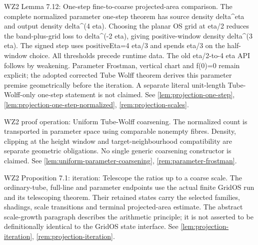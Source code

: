 \begin{remark}
\label{rem:atlas-W2L7_12}
WZ2 Lemma 7.12: One-step fine-to-coarse projected-area comparison.
The complete normalized parameter one-step theorem has source density delta\textasciicircum{}eta and output density delta\textasciicircum{}(4 eta). Choosing the planar OS grid at eta/2 reduces the band-plus-grid loss to delta\textasciicircum{}(-2 eta), giving positive-window density delta\textasciicircum{}(3 eta). The signed step uses positiveEta=4 eta/3 and spends eta/3 on the half-window choice. All thresholds precede runtime data. The old eta/2-to-4 eta API follows by weakening. Parameter Frostman, vertical chart and f(0)=0 remain explicit; the adopted corrected Tube Wolff theorem derives this parameter premise geometrically before the iteration. A separate literal unit-length Tube-Wolff-only one-step statement is not claimed.
See \ref{lem:projection-one-step}, \ref{lem:projection-one-step-normalized}, \ref{rem:projection-scales}.
\end{remark}

\begin{remark}
\label{rem:atlas-IcoarseTW}
WZ2 proof operation: Uniform Tube-Wolff coarsening.
The normalized count is transported in parameter space using comparable nonempty fibres. Density, clipping at the height window and target-neighbourhood compatibility are separate geometric obligations. No single generic coarsening constructor is claimed.
See \ref{lem:uniform-parameter-coarsening}, \ref{rem:parameter-frostman}.
\end{remark}

\begin{remark}
\label{rem:atlas-W2Iterate}
WZ2 Proposition 7.1: iteration: Telescope the ratios up to a coarse scale.
The ordinary-tube, full-line and parameter endpoints use the actual finite GridOS run and its telescoping theorem. Their retained states carry the selected families, shadings, scale transitions and terminal projected-area estimate. The abstract scale-growth paragraph describes the arithmetic principle; it is not asserted to be definitionally identical to the GridOS state interface.
See \ref{lem:projection-iteration}, \ref{rem:projection-iteration}.
\end{remark}


